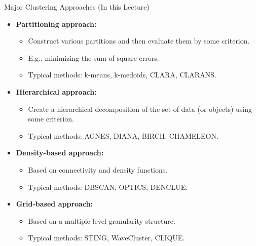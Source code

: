 \begin{frame}{Major Clustering Approaches (In this Lecture)}
	\begin{itemize}
		\item \textbf{Partitioning approach:}
		      \begin{itemize}
			      \item Construct various partitions and then evaluate them by some
			            criterion.
			      \item E.g., minimizing the sum of square errors.
			      \item Typical methods: k-means, k-medoids, CLARA, CLARANS.
		      \end{itemize}
		\item \textbf{Hierarchical approach:}
		      \begin{itemize}
			      \item Create a hierarchical decomposition of the set of data (or
			            objects) using some criterion.
			      \item Typical methods: AGNES, DIANA, BIRCH, CHAMELEON.
		      \end{itemize}
		\item \textbf{Density-based approach:}
		      \begin{itemize}
			      \item Based on connectivity and density functions.
			      \item Typical methods: DBSCAN, OPTICS, DENCLUE.
		      \end{itemize}
		\item \textbf{Grid-based approach:}
		      \begin{itemize}
			      \item Based on a multiple-level granularity structure.
			      \item Typical methods: STING, WaveCluster, CLIQUE.
		      \end{itemize}
	\end{itemize}
\end{frame}

